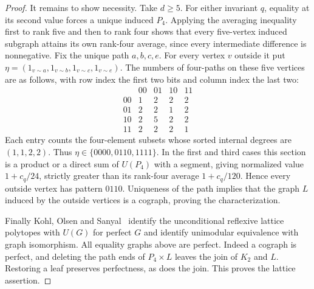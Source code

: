 \documentclass[11pt,a4paper]{article}
\numberwithin{equation}{section}
\begin{document}
\begin{proof}
It remains to show necessity. Take $d\ge5$. For either invariant $q$, equality at its second value forces a unique induced $P_4$. Applying the averaging inequality first to rank five and then to rank four shows that every five-vertex induced subgraph attains its own rank-four average, since every intermediate difference is nonnegative. Fix the unique path $a,b,c,e$. For every vertex $v$ outside it put $\eta=(1_{v\sim a},1_{v\sim b},1_{v\sim c},1_{v\sim e})$. The numbers of four-paths on these five vertices are as follows, with row index the first two bits and column index the last two:
\[
\begin{array}{c|rrrr}
 &00&01&10&11\\\hline
00&1&2&2&2\\
01&2&2&1&2\\
10&2&5&2&2\\
11&2&2&2&1
\end{array}
\]
Each entry counts the four-element subsets whose sorted internal degrees are $(1,1,2,2)$. Thus $\eta\in\{0000,0110,1111\}$. In the first and third cases this section is a product or a direct sum of $U(P_4)$ with a segment, giving normalized value $1+c_q/24$, strictly greater than its rank-four average $1+c_q/120$. Hence every outside vertex has pattern $0110$. Uniqueness of the path implies that the graph $L$ induced by the outside vertices is a cograph, proving the characterization.

Finally Kohl, Olsen and Sanyal~\cite[Theorems 4.6 and 4.9]{KOS} identify the unconditional reflexive lattice polytopes with $U(G)$ for perfect $G$ and identify unimodular equivalence with graph isomorphism. All equality graphs above are perfect. Indeed a cograph is perfect, and deleting the path ends of $P_4\times L$ leaves the join of $K_2$ and $L$. Restoring a leaf preserves perfectness, as does the join. This proves the lattice assertion.
\end{proof}
\end{document}

